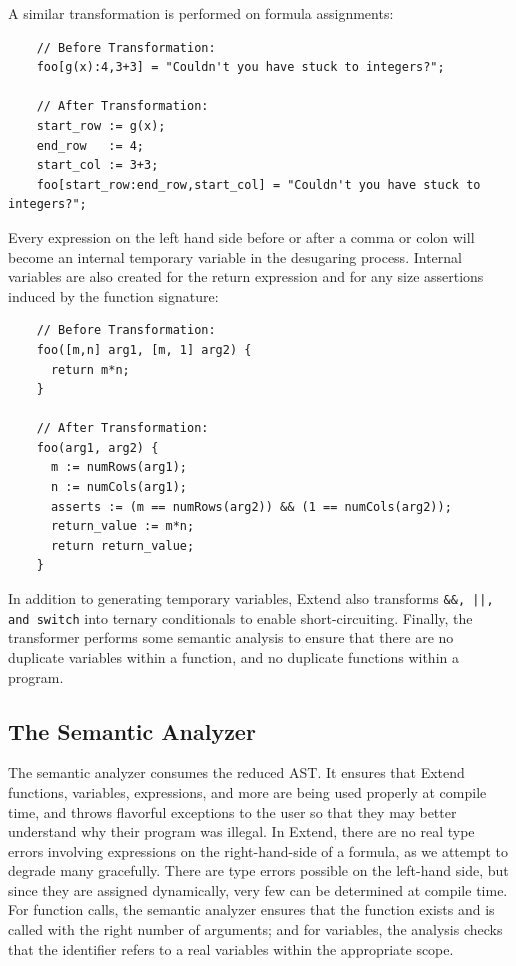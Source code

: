   \medskip \noindent
  A similar transformation is performed on formula assignments:
  \begin{lstlisting}
    // Before Transformation:
    foo[g(x):4,3+3] = "Couldn't you have stuck to integers?";

    // After Transformation:
    start_row := g(x);
    end_row   := 4;
    start_col := 3+3;
    foo[start_row:end_row,start_col] = "Couldn't you have stuck to integers?";
  \end{lstlisting}
  \medskip \noindent
  Every expression on the left hand side before or after a comma or colon will become an internal temporary variable in the desugaring process. Internal variables are also created for the return expression and for any size assertions induced by the function signature:
  \begin{lstlisting}
    // Before Transformation:
    foo([m,n] arg1, [m, 1] arg2) {
      return m*n;
    }

    // After Transformation:
    foo(arg1, arg2) {
      m := numRows(arg1);
      n := numCols(arg1);
      asserts := (m == numRows(arg2)) && (1 == numCols(arg2));
      return_value := m*n;
      return return_value;
    }
  \end{lstlisting}
  In addition to generating temporary variables, Extend also transforms \texttt{\&\&, ||, and switch} into ternary conditionals to enable short-circuiting. Finally, the transformer performs some semantic analysis to ensure that there are no duplicate variables within a function, and no duplicate functions within a program.

  \subsection{The Semantic Analyzer}
  The semantic analyzer consumes the reduced AST. It ensures that Extend functions, variables, expressions, and more are being used properly at compile time, and throws flavorful exceptions to the user so that they may better understand why their program was illegal. In Extend, there are no real type errors involving expressions on the right-hand-side of a formula, as we attempt to degrade many gracefully. There are type errors possible on the left-hand side, but since they are assigned dynamically, very few can be determined at compile time. For function calls, the semantic analyzer ensures that the function exists and is called with the right number of arguments; and for variables, the analysis checks that the identifier refers to a real variables within the appropriate scope.

